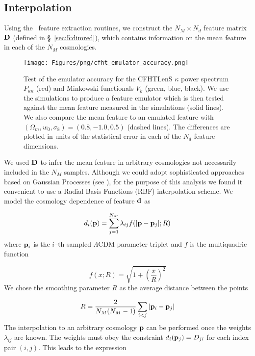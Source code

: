 \subsection{Interpolation}
Using the \LT\, feature extraction routines, we construct the $N_M\times N_d$ feature matrix $\mathbf{D}$ (defined in \S~\ref{sec:5:dimred}), which contains information on the mean feature in each of the $N_M$ cosmologies. 
%
\begin{figure}
\begin{center}
\texttt{[image: Figures/png/cfht\_emulator\_accuracy.png]}
\end{center}
\caption{Test of the emulator accuracy for the CFHTLenS $\kappa$ power spectrum $P_{\kappa\kappa}$ (red) and Minkowski functionals $V_k$ (green, blue, black). We use the  simulations to produce a feature emulator which is then tested against the mean feature measured in the  simulations (solid lines). We also compare the mean  feature to an emulated feature with $(\Omega_m,w_0,\sigma_8)=(0.8,-1.0,0.5)$ (dashed lines). The differences are plotted in units of the statistical error in each of the $N_d$ feature dimensions.}
\label{fig:6:interpolation}
\end{figure}
%
We used $\mathbf{D}$ to infer the mean feature in arbitrary cosmologies not necessarily included in the $N_M$ samples. Although we could adopt sophisticated approaches based on Gaussian Processes (see \citep{Coyote2}), for the purpose of this analysis we found it convenient to use a Radial Basis Functions (RBF) interpolation scheme. We model the cosmology dependence of feature $\mathbf{d}$ as

\begin{equation}
\label{eq:6:rbf}
d_i(\mathbf{p}) = \sum_{j=1}^{N_M} \lambda_{ij}f(\vert\mathbf{p}-\mathbf{p}_j\vert;R)
\end{equation}  
%
where $\mathbf{p}_i$ is the $i$--th sampled $\Lambda$CDM parameter triplet and $f$ is the multiquadric function

\begin{equation}
\label{eq:6:multiquadric}
f(x;R) = \sqrt{1+\left(\frac{x}{R}\right)^2}
\end{equation}
%
We chose the smoothing parameter $R$ as the average distance between the  points

\begin{equation}
\label{eq:6:scale}
R = \frac{2}{N_M(N_M-1)}\sum_{i<j}\vert\mathbf{p}_i-\mathbf{p}_j\vert
\end{equation} 
%
The interpolation to an arbitrary cosmology $\mathbf{p}$ can be performed once the weights $\lambda_{ij}$ are known. The weights must obey the constraint $d_i(\mathbf{p}_j) = D_{ji}$ for each index pair $(i,j)$. This leads to the expression  

